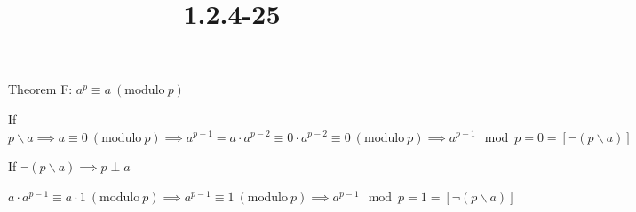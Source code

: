 \documentclass{article}
\title{1.2.4-25}
\begin{document}
\maketitle

Theorem F: $a^{p} \equiv a\ (\mathrm{modulo}\ p)$

If $p \backslash a \implies a \equiv 0\ (\mathrm{modulo}\ p) \implies a^{p-1} = a \cdot a^{p-2} \equiv 0 \cdot a^{p-2} \equiv 0\ (\mathrm{modulo}\ p) \implies a^{p-1} \mod p = 0 = [\lnot(p \backslash a)]$

If $\lnot(p \backslash a) \implies p \perp a$

$a \cdot a^{p-1} \equiv a \cdot 1\ (\mathrm{modulo}\ p) \implies a^{p-1}\equiv 1\ (\mathrm{modulo}\ p) \implies a^{p-1} \mod p = 1 = [\lnot(p \backslash a)]$
\end{document}
